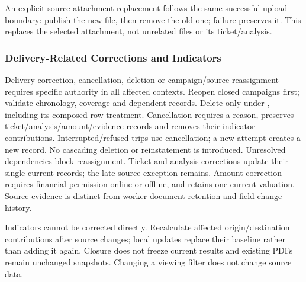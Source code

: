 An explicit source-attachment replacement follows the same successful-upload
boundary: publish the new file, then remove the old one; failure preserves it.
This replaces the selected attachment, not unrelated files or its ticket/analysis.

\subsubsection{Delivery-Related Corrections and Indicators}
Delivery correction, cancellation, deletion or campaign/source reassignment requires
specific authority in all affected contexts. Reopen closed campaigns first; validate
chronology, coverage and dependent records. Delete only under \hyperref[br:031]{}, including its composed-row treatment.
Cancellation requires a reason, preserves ticket/analysis/amount/evidence records
and removes their indicator contributions. Interrupted/refused trips use cancellation; a new attempt creates a new record. No cascading deletion or reinstatement is introduced. Unresolved dependencies block reassignment.
Ticket and analysis corrections update their single current records; the late-source
exception remains. Amount correction requires financial permission online or
offline, and retains one current valuation. Source evidence is distinct from
worker-document retention and field-change history.

Indicators cannot be corrected directly. Recalculate affected origin/destination
contributions after source changes; local updates replace their baseline rather
than adding it again. Closure does not freeze current results and existing PDFs
remain unchanged snapshots. Changing a viewing filter does not change source data.
